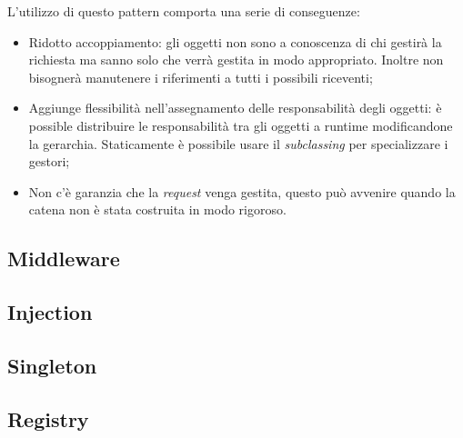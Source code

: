 	L'utilizzo di questo pattern comporta una serie di conseguenze:
		\begin{itemize}
			\item Ridotto accoppiamento: gli oggetti non sono a conoscenza di chi gestirà la richiesta ma sanno solo che verrà gestita in modo appropriato. Inoltre non bisognerà manutenere i riferimenti a tutti i possibili riceventi;
			\item Aggiunge flessibilità nell'assegnamento delle responsabilità degli oggetti: è possible distribuire le responsabilità tra gli oggetti a runtime modificandone la gerarchia. Staticamente è possibile usare il \emph{subclassing} per specializzare i gestori;
 			\item Non c'è garanzia che la \emph{request} venga gestita, questo può avvenire quando la catena non è stata costruita in modo rigoroso.
		\end{itemize}
	
		
	
	\subsection{Middleware} 
	\subsection{Injection} %
	\subsection{Singleton} %
	\subsection{Registry} %